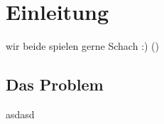 \chapter{Einleitung}

wir beide spielen gerne Schach :) (\cite{tartarini2022personal})

\section{Das Problem}

asdasd